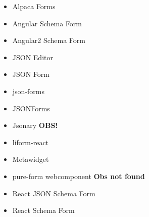 \begin{itemize}
	\item Alpaca Forms \cite{GitanaSoftwareInc.}
	\item Angular Schema Form \cite{Textalk}
	\item Angular2 Schema Form \cite{MakinaCorpus}
	\item JSON Editor \cite{JeremyDorn}
	\item JSON Form \cite{Joshfire}
	\item json-forms \cite{Brutusin.org}
	\item JSONForms  \cite{EclipseSource}
	\item Jsonary  \textbf{OBS!}
	\item liform-react \cite{NachoMartin}
	\item Metawidget \cite{Metawidget}
	\item pure-form webcomponent \textbf{Obs not found}
	\item React JSON Schema Form \cite{MozillaServices}
	\item React Schema Form \cite{NetworkNewTechnologiesInc.}
\end{itemize}

%
%


%
%
%	




